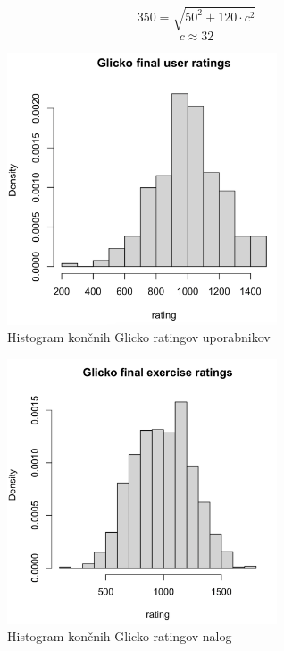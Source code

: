 \documentclass{IEEEtran}
\begin{document}
\begin{equation}
    350=\sqrt{50^{2}+120\cdot c^{2}}
\end{equation}
\begin{equation}
    c\approx 32
\end{equation}


\begin{figure}[h!]
    \includegraphics[width=8cm]{GlickoUser}
    \caption{Histogram končnih Glicko ratingov uporabnikov}%
    \label{fig:example}%
\end{figure}
\begin{figure}[h!]
    \includegraphics[width=8cm]{GlickoExercise}
    \caption{Histogram končnih Glicko ratingov nalog}%
    \label{fig:example}%
\end{figure}
\end{document}
